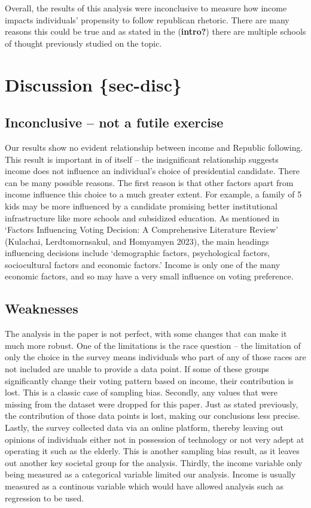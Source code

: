 \documentclass[
  letterpaper,
  DIV=11,
  numbers=noendperiod]{scrartcl}
\begin{document}
Overall, the results of this analysis were inconclusive to measure how
income impacts individuals' propensity to follow republican rhetoric.
There are many reasons this could be true and as stated in the
(\textbf{intro?}) there are multiple schools of thought previously
studied on the topic.

\section{Discussion \{sec-disc\}}\label{discussion-sec-disc}

\subsection{Inconclusive -- not a futile
exercise}\label{inconclusive-not-a-futile-exercise}

Our results show no evident relationship between income and Republic
following. This result is important in of itself -- the insignificant
relationship suggests income does not influence an individual's choice
of presidential candidate. There can be many possible reasons. The first
reason is that other factors apart from income influence this choice to
a much greater extent. For example, a family of 5 kids may be more
influenced by a candidate promising better institutional infrastructure
like more schools and subsidized education. As mentioned in `Factors
Influencing Voting Decision: A Comprehensive Literature Review'
(Kulachai, Lerdtomornsakul, and Homyamyen 2023), the main headings
influencing decisions include `demographic factors, psychological
factors, sociocultural factors and economic factors.' Income is only one
of the many economic factors, and so may have a very small influence on
voting preference.

\subsection{Weaknesses}\label{weaknesses}

The analysis in the paper is not perfect, with some changes that can
make it much more robust. One of the limitations is the race question --
the limitation of only the choice in the survey means individuals who
part of any of those races are not included are unable to provide a data
point. If some of these groups significantly change their voting pattern
based on income, their contribution is lost. This is a classic case of
sampling bias. Secondly, any values that were missing from the dataset
were dropped for this paper. Just as stated previously, the contribution
of those data points is lost, making our conclusions less precise.
Lastly, the survey collected data via an online platform, thereby
leaving out opinions of individuals either not in possession of
technology or not very adept at operating it such as the elderly. This
is another sampling bias result, as it leaves out another key societal
group for the analysis. Thirdly, the income variable only being measured
as a categorical variable limited our analysis. Income is usually
measured as a continous variable which would have allowed analysis such
as regression to be used.
\end{document}
